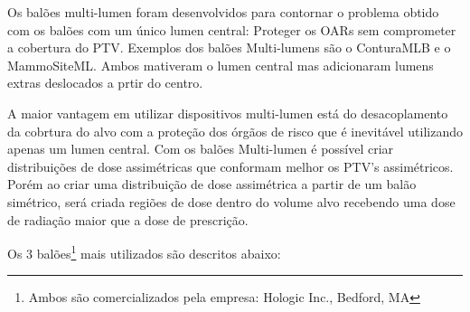 \documentclass[11pt,a4paper]{article}
\begin{document}
			Os balões multi-lumen foram desenvolvidos para contornar o problema obtido com os balões com um único lumen central: Proteger os OARs sem comprometer a cobertura do PTV. Exemplos dos balões Multi-lumens são o ConturaMLB e o MammoSiteML. Ambos mativeram o lumen central mas adicionaram lumens extras deslocados a prtir do centro. 

			A maior vantagem em utilizar dispositivos multi-lumen está do desacoplamento da cobrtura do alvo com a proteção dos órgãos de risco que é inevitável utilizando apenas um lumen central. Com os balões Multi-lumen é possível criar distribuições de dose assimétricas que conformam melhor os PTV's assimétricos. Porém ao criar uma distribuição de dose assimétrica a partir de um balão simétrico, será criada regiões de dose dentro do volume alvo recebendo uma dose de radiação maior que a dose de prescrição.

			Os 3 balões\footnote{Ambos são comercializados pela empresa: Hologic Inc., Bedford, MA} mais utilizados são descritos abaixo:
			
\end{document}
